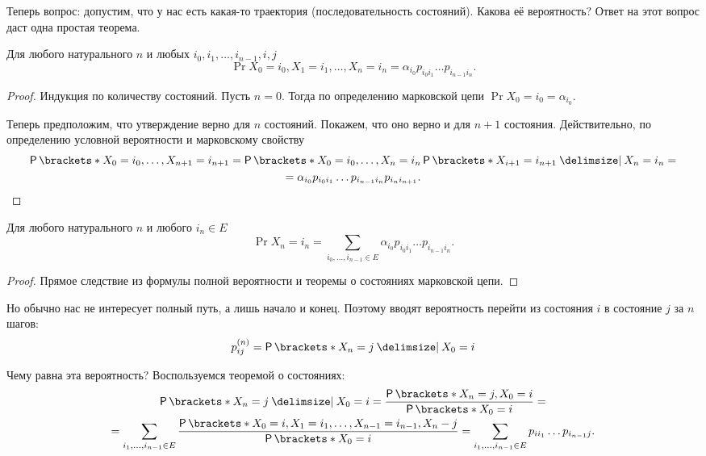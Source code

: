 Теперь вопрос: допустим, что у нас есть какая-то траектория (последовательность 
состояний). Какова её вероятность? Ответ на этот вопрос даст одна простая 
теорема.
\begin{theorem}\label{markov-chain-states-theorem}
	Для любого натурального \(n\) и любых \(i_{0}, i_{1}, \dots, i_{n - 1}, i, 
	j\)
	\[
		\Pr{X_{0} = i_{0}, X_{1} = i_{1}, \dots, X_{n} = i_{n}} = 
		\alpha_{i_{0}} p_{i_{0}i_{1}} \ldots p_{i_{n - 1}i_{n}}.
	\]
\end{theorem}
\begin{proof}
	Индукция по количеству состояний. Пусть \(n = 0\). Тогда по определению 
	марковской цепи \(\Pr{X_{0} = i_{0}} = \alpha_{i_{0}}\).
	
	Теперь предположим, что утверждение верно для \(n\) состояний. Покажем, что 
	оно верно и для \(n + 1\) состояния. Действительно, по определению условной 
	вероятности и марковскому свойству
	\begin{multline*}
		\Pr{X_{0} = i_{0}, \dots, X_{n + 1} = i_{n + 1}} = \Pr{X_{0} = i_{0},  
		\dots, X_{n} = i_{n}}\Pr{X_{i + 1} = i_{n + 1} \given X_{n} = i_{n}} = 
		\\ = \alpha_{i_{0}} p_{i_{0}i_{1}} \ldots p_{i_{n - 1}i_{n}} 
		p_{i_{n}i_{n + 1}}. \qedhere
	\end{multline*}
\end{proof}
\begin{consequence}
	Для любого натурального \(n\) и любого \(i_{n} \in E\)
	\[
		\Pr{X_{n} = i_{n}} = \sum_{i_{0}, \ldots, i_{n - 1} \in E} 
		\alpha_{i_{0}} p_{i_{0}i_{1}} \ldots p_{i_{n - 1}i_{n}}.
	\]
\end{consequence}
\begin{proof}
	Прямое следствие из формулы полной вероятности и теоремы о состояниях 
	марковской цепи.
\end{proof}

Но обычно нас не интересует полный путь, а лишь начало и конец. Поэтому вводят 
вероятность перейти из состояния \(i\) в состояние \(j\) за \(n\) шагов:
\[
	p_{ij}^{(n)} = \Pr{X_{n} = j \given X_{0} = i}
\]

Чему равна эта вероятность? Воспользуемся теоремой о состояниях:
\begin{multline*}
	\Pr{X_{n} = j \given X_{0} = i} = \frac{\Pr{X_{n} = j, X_{0} = 
	i}}{\Pr{X_{0} = i}} = \\ = \sum_{i_{1}, \ldots, i_{n - 1} \in E} 
	\frac{\Pr{X_{0} = i, X_{1} = i_{1}, \dots, X_{n - 1} = i_{n - 1}, X_{n} - 
	j}}{\Pr{X_{0} = i}} = \sum_{i_{1}, \ldots, i_{n - 1} \in E} p_{ii_{1}} 
	\ldots p_{i_{n - 1}j}.
\end{multline*}

